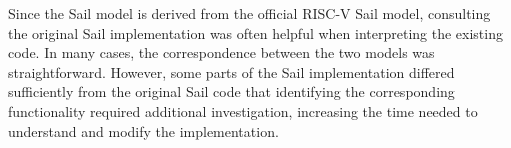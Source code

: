 Since the \textmu{}Sail model is derived from the official RISC-V Sail model, consulting the original Sail implementation was often helpful when interpreting the existing code.
In many cases, the correspondence between the two models was straightforward.
However, some parts of the \textmu{}Sail implementation differed sufficiently from the original Sail code that identifying the corresponding functionality required additional investigation, increasing the time needed to understand and modify the implementation.

